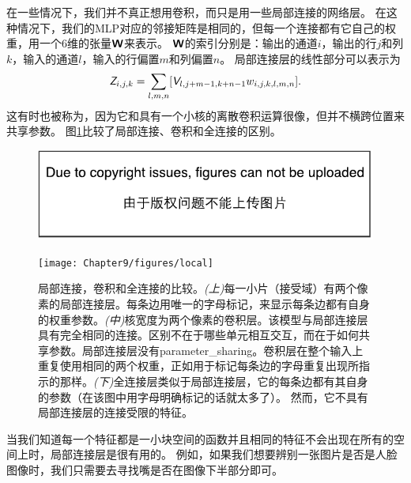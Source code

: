 在一些情况下，我们并不真正想用卷积，而只是用一些局部连接的网络层\citep{LeCun86,LeCun89a}。
在这种情况下，我们的\gls{MLP}对应的邻接矩阵是相同的，但每一个连接都有它自己的权重，用一个6维的张量$\textsf{\textbf{W}}$来表示。
$\textsf{\textbf{W}}$的索引分别是：输出的通道$i$，输出的行$j$和列$k$，输入的通道$l$，输入的行偏置$m$和列偏置$n$。
局部连接层的线性部分可以表示为
\begin{equation}
\TEZ_{i,j,k} = \sum_{l,m,n} [\TEV_{l, j+m-1, k+n-1} w_{i, j, k, l, m, n}]. %
\end{equation}
这有时也被称为，因为它和具有一个小核的离散卷积运算很像，但并不横跨位置来共享参数。
图\ref{fig:chap9_local}比较了局部连接、卷积和全连接的区别。
\begin{figure}[!htb]
\ifOpenSource
\centerline{\includegraphics{figure.pdf}}
\else
\centerline{\texttt{[image: Chapter9/figures/local]}}
\fi
\caption{局部连接，卷积和全连接的比较。\emph{(上)}每一小片（接受域）有两个像素的局部连接层。每条边用唯一的字母标记，来显示每条边都有自身的权重参数。\emph{(中)}核宽度为两个像素的卷积层。该模型与局部连接层具有完全相同的连接。区别不在于哪些单元相互交互，而在于如何共享参数。局部连接层没有\gls{parameter_sharing}。卷积层在整个输入上重复使用相同的两个权重，正如用于标记每条边的字母重复出现所指示的那样。\emph{(下)}全连接层类似于局部连接层，它的每条边都有其自身的参数（在该图中用字母明确标记的话就太多了）。 然而，它不具有局部连接层的连接受限的特征。}
\label{fig:chap9_local}
\end{figure}
 
 
当我们知道每一个特征都是一小块空间的函数并且相同的特征不会出现在所有的空间上时，局部连接层是很有用的。
例如，如果我们想要辨别一张图片是否是人脸图像时，我们只需要去寻找嘴是否在图像下半部分即可。

